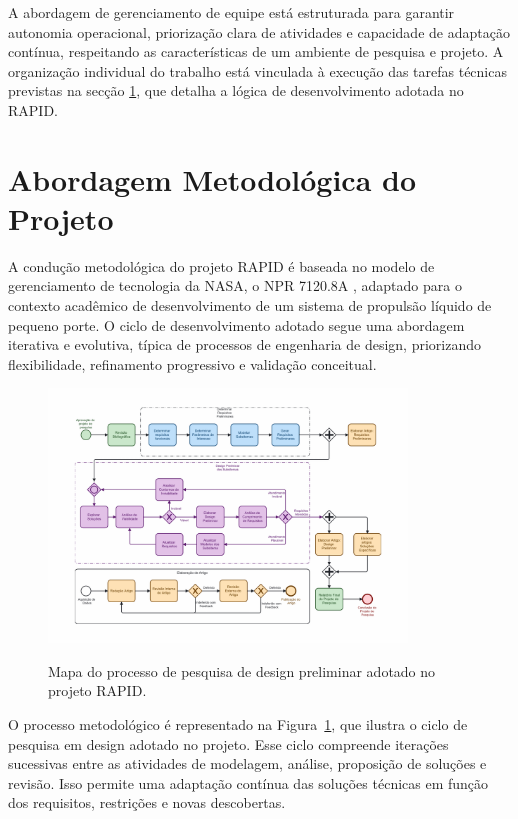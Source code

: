 A abordagem de gerenciamento de equipe está estruturada para garantir autonomia operacional, priorização clara de atividades e capacidade de adaptação contínua, respeitando as características de um ambiente de pesquisa e projeto. A organização individual do trabalho está vinculada à execução das tarefas técnicas previstas na secção \ref{sec:metod}, que detalha a lógica de desenvolvimento adotada no \Gls{RAPID}.

\section{Abordagem Metodológica do Projeto}\label{sec:metod}

A condução metodológica do projeto \Gls{RAPID} é baseada no modelo de gerenciamento de tecnologia da NASA, o NPR 7120.8A \cite{NASAResearchTechnology2018}, adaptado para o contexto acadêmico de desenvolvimento de um sistema de propulsão líquido de pequeno porte. O ciclo de desenvolvimento adotado segue uma abordagem iterativa e evolutiva, típica de processos de engenharia de design, priorizando flexibilidade, refinamento progressivo e validação conceitual.

\begin{figure}[h!]
    \centering
    \caption{Mapa do processo de pesquisa de design preliminar adotado no projeto \Gls{RAPID}.}
    \includegraphics[width=0.85\textwidth]{Imagens/ProcessoDePesquisaDeDesign}
    \label{fig:bpmn}
\end{figure}

O processo metodológico é representado na Figura~\ref{fig:bpmn}, que ilustra o ciclo de pesquisa em design adotado no projeto. Esse ciclo compreende iterações sucessivas entre as atividades de modelagem, análise, proposição de soluções e revisão. Isso permite uma adaptação contínua das soluções técnicas em função dos requisitos, restrições e novas descobertas.

